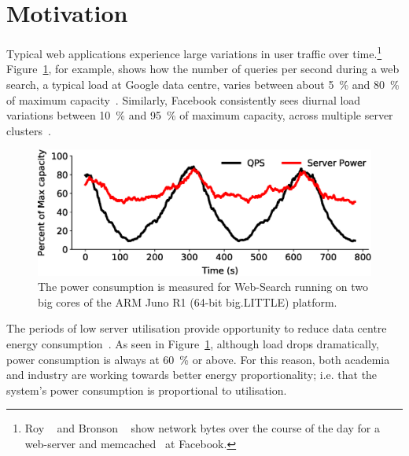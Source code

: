 \section{Motivation}
\label{sec:Motivation}

Typical web applications experience large variations in user traffic over
time.\footnote{Roy \etal~\citep{Roy:2015:ISN:2785956.2787472} and Bronson
\etal~\citep{180185} show network bytes over the course of the day for a web-server and
memcached~\citep{Nishtala2013ScalingFacebook} at Facebook.}
Figure~\ref{fig:websearchmotivation}, for example, shows how the number of queries per second during a web search, 
a typical load at Google data centre, varies between about
\SI{5}{\percent} and \SI{80}{\percent} of maximum capacity~\citep{Hoelzle2009TheMachinesb,
Meisner2011PowerServices,Lo2014TowardsWorkloads}.  Similarly, Facebook consistently sees
diurnal load variations between \SI{10}{\percent} and \SI{95}{\percent} of maximum
capacity, across multiple server clusters~\citep{Bilgir_exploringthe,
Atikoglu2012WorkloadStore}.

\begin{figure}[ht]
	\centering
    \includegraphics[width=\textwidth]{Chapter4/Figs/google_trace.eps}
    \caption[Power drawn for a diurnal load]{ The power consumption is measured for Web-Search running on two big cores of the ARM Juno R1 (64-bit big.LITTLE) platform.}
	\label{fig:websearchmotivation}
\end{figure}


The periods of low server utilisation provide opportunity to reduce data centre energy
consumption~\citep{Petrucci2015Octopus-Man:Computers, Lo2015Heracles,
Delimitrou2013Paragon:Datacenters, Delimitrou:2013:QSH:2542150.2556583}. As seen in
Figure~\ref{fig:websearchmotivation}, although load drops dramatically, power consumption
is always at \SI{60}{\percent} or above.  For this reason, both academia and industry are
working towards better energy proportionality; i.e. that the system's power consumption is
proportional to utilisation.

